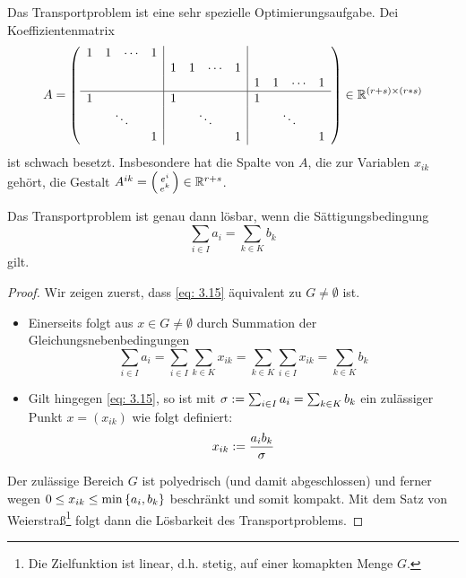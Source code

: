 \begin{bemerkung} %
	Das Transportproblem ist eine sehr spezielle Optimierungsaufgabe. Dei Koeffizientenmatrix 
	\begin{equation*}
		A = 
		\left( \begin{array}{cccc|cccc|cccc}
		1 & 1 & \cdots & 1 &   &   &        &   &   &   &        &\\
		  &   &        &   & 1 & 1 & \cdots & 1 &   &   &        &\\
		  &   &        &   &   &   &        &   & 1 & 1 & \cdots & 1  \\
		\hline
		1 &   &        &   & 1 &   &        &   & 1 &   &        &  \\
		  & \multicolumn{2}{c}{\ddots} & & & \multicolumn{2}{c}{\ddots} & & & \multicolumn{2}{c}{\ddots} & \\
		  &   &        & 1 &   &   &        & 1 &   &   &        & 1  \\	  
		\end{array} \right) \in \R^{(r+s) \times (r*s)}
	\end{equation*}
	ist schwach besetzt. Insbesondere hat die Spalte von $A$, die zur Variablen $x_{ik}$ gehört, die Gestalt $A^{ik} = \begin{psmallmatrix} e^i \\ e^k \end{psmallmatrix} \in \mathbb{R}^{r+s}$.
\end{bemerkung}

\begin{satz} %
	Das Transportproblem ist genau dann lösbar, wenn die Sättigungsbedingung
	\begin{equation}
		\sum_{i \in I} a_i = \sum_{k \in K} b_k
		\label{eq: 3.15}
	\end{equation}
	gilt.
\end{satz}
\begin{proof}
	Wir zeigen zuerst, dass \eqref{eq: 3.15}  äquivalent zu $G \neq \emptyset$ ist.
	\begin{itemize}
		\item Einerseits folgt aus $x \in G \neq \emptyset$ durch Summation der Gleichungsnebenbedingungen
		\begin{equation*}
			\sum_{i \in I} a_i = \sum_{i \in I} \sum_{k \in K} x_{ik} = \sum_{k \in K} \sum_{i \in I} x_{ik} = \sum_{k \in K} b_k
		\end{equation*}
		\item  Gilt hingegen \eqref{eq: 3.15}, so ist mit $\sigma \mathrel{:=} \sum_{i \in I} a_i = \sum_{k \in K} b_k$ ein zulässiger Punkt $x = (x_{ik})$ wie folgt definiert:
		\begin{equation*}
			x_{ik} \mathrel{:=} \frac{a_i b_k}{\sigma}
		\end{equation*}
	\end{itemize}
	Der zulässige Bereich $G$ ist polyedrisch (und damit abgeschlossen) und ferner wegen $0 \le x_{ik} \le \min\left\{ a_i, b_k \right\}$ beschränkt und somit kompakt.
	Mit dem Satz von Weierstraß\footnote{Die Zielfunktion ist linear, d.h. stetig, auf einer komapkten Menge $G$.} folgt dann die Lösbarkeit des Transportproblems.
\end{proof}

